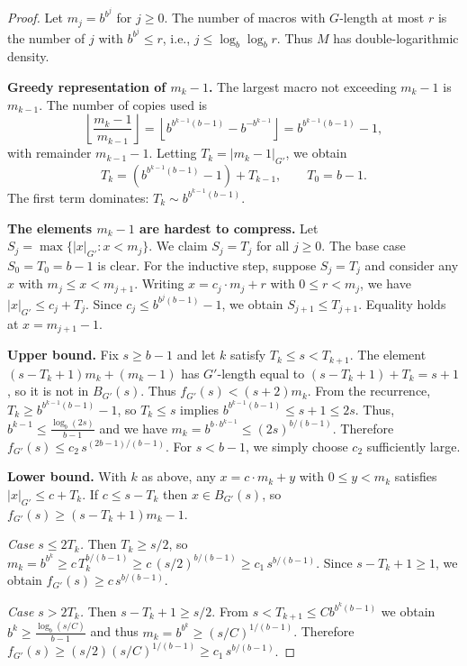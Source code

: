 \documentclass[12pt]{amsart}
\theoremstyle{definition}
\theoremstyle{remark}
\begin{document}
\begin{proof}
Let $m_j = b^{b^j}$ for $j \geq 0$.
The number of macros with $G$-length at most $r$ is the number of $j$ with $b^{b^j} \leq r$, i.e., $j \leq \log_b \log_b r$.
Thus $M$ has double-logarithmic density.

\textbf{Greedy representation of $m_k - 1$.}
The largest macro not exceeding $m_k - 1$ is $m_{k-1}$.
The number of copies used is
\[
\left\lfloor \frac{m_k - 1}{m_{k-1}} \right\rfloor = \left\lfloor b^{b^{k-1}(b-1)} - b^{-b^{k-1}} \right\rfloor = b^{b^{k-1}(b-1)} - 1,
\]
with remainder $m_{k-1} - 1$.
Letting $T_k = |m_k - 1|_{G'}$, we obtain
\[
T_k = (b^{b^{k-1}(b-1)} - 1) + T_{k-1}, \qquad T_0 = b - 1.
\]
The first term dominates: $T_k \sim b^{b^{k-1}(b-1)}$.

\textbf{The elements $m_k - 1$ are hardest to compress.}
Let $S_j = \max\{|x|_{G'} : x < m_j\}$.
We claim $S_j = T_j$ for all $j \geq 0$.
The base case $S_0 = T_0 = b - 1$ is clear.
For the inductive step, suppose $S_j = T_j$ and consider any $x$ with $m_j \leq x < m_{j+1}$.
Writing $x = c_j \cdot m_j + r$ with $0 \leq r < m_j$, we have $|x|_{G'} \leq c_j + T_j$.
Since $c_j \leq b^{b^j(b-1)} - 1$, we obtain $S_{j+1} \leq T_{j+1}$.
Equality holds at $x = m_{j+1} - 1$.

\textbf{Upper bound.}
Fix $s \geq b - 1$ and let $k$ satisfy $T_k \leq s < T_{k+1}$.
The element $(s - T_k + 1) m_k + (m_k - 1)$ has $G'$-length equal to $(s - T_k + 1) + T_k = s + 1$, so it is not in $B_{G'}(s)$.
Thus $f_{G'}(s) < (s + 2) m_k$.
From the recurrence, $T_k \geq b^{b^{k-1}(b-1)} - 1$, so $T_k \leq s$ implies $b^{b^{k-1}(b-1)} \leq s + 1 \leq 2s$.
Thus, $b^{k-1} \leq \frac{\log_b(2s)}{b-1}$ and we have $m_k = b^{b \cdot b^{k-1}} \leq (2s)^{b/(b-1)}$.
Therefore $f_{G'}(s) \leq c_2 \, s^{(2b-1)/(b-1)}$.
For $s < b - 1$, we simply choose $c_2$ sufficiently large.

\textbf{Lower bound.}
With $k$ as above, any $x = c \cdot m_k + y$ with $0 \leq y < m_k$ satisfies $|x|_{G'} \leq c + T_k$.
If $c \leq s - T_k$ then $x \in B_{G'}(s)$, so $f_{G'}(s) \geq (s - T_k + 1) m_k - 1$.

\textit{Case $s \leq 2T_k$.}
Then $T_k \geq s/2$, so $m_k = b^{b^k} \geq c \, T_k^{b/(b-1)} \geq c \, (s/2)^{b/(b-1)} \geq c_1 \, s^{b/(b-1)}$.
Since $s - T_k + 1 \geq 1$, we obtain $f_{G'}(s) \geq c \, s^{b/(b-1)}$.

\textit{Case $s > 2T_k$.}
Then $s - T_k + 1 \geq s/2$.
From $s < T_{k+1} \leq C b^{b^k(b-1)}$ we obtain $b^k \geq \frac{\log_b(s/C)}{b-1}$ and thus $m_k = b^{b^k} \geq (s/C)^{1/(b-1)}$.
Therefore $f_{G'}(s) \geq (s/2)(s/C)^{1/(b-1)} \geq c_1 \, s^{b/(b-1)}$.
\end{proof}
\end{document}
